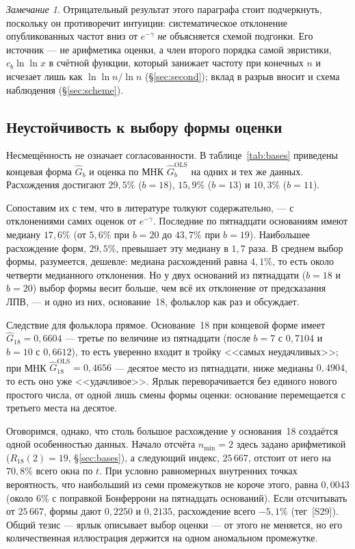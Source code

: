 \documentclass[11pt,a4paper]{article}
\theoremstyle{plain}
\theoremstyle{remark}
\newtheorem{remark}{Замечание}
\newcommand{\emg}{e^{-\gamma}}
\begin{document}
\begin{remark}
Отрицательный результат этого параграфа стоит подчеркнуть, поскольку он противоречит
интуиции: систематическое отклонение опубликованных частот вниз от $\emg$
\emph{не} объясняется схемой подгонки. Его источник --- не арифметика оценки, а
член второго порядка самой эвристики, $c_b\ln\ln x$ в счётной функции, который
занижает частоту при конечных $n$ и исчезает лишь как $\ln\ln n/\ln n$
(\S\ref{sec:second}); вклад в разрыв вносит и схема наблюдения
(\S\ref{sec:scheme}).
\end{remark}

\subsection{Неустойчивость к выбору формы оценки}\label{sec:instability}

Несмещённость не означает согласованности. В таблице~\ref{tab:bases} приведены
концевая форма $\hat G_b$ и оценка по МНК $\hat G_b^{\mathrm{OLS}}$ на одних и тех же
данных. Расхождения достигают $29{,}5\%$ ($b=18$), $15{,}9\%$ ($b=13$) и $10{,}3\%$
($b=11$).

Сопоставим их с тем, что в литературе толкуют содержательно, --- с отклонениями
самих оценок от $\emg$. Последние по пятнадцати основаниям имеют медиану $17{,}6\%$
(от $5{,}6\%$ при $b=20$ до $43{,}7\%$ при $b=19$). Наибольшее расхождение форм,
$29{,}5\%$, превышает эту медиану в $1{,}7$ раза. В среднем выбор формы, разумеется,
дешевле: медиана расхождений равна $4{,}1\%$, то есть около четверти медианного
отклонения. Но у двух оснований из пятнадцати ($b=18$ и $b=20$) выбор формы весит
больше, чем всё их отклонение от предсказания ЛПВ, --- и одно из них, основание~18,
фольклор как раз и обсуждает.

Следствие для фольклора прямое. Основание~18 при концевой форме имеет
$\hat G_{18}=0{,}6604$ --- третье по величине из пятнадцати (после $b=7$ с $0{,}7104$
и $b=10$ с $0{,}6612$), то есть уверенно входит в тройку <<самых неудачливых>>; при МНК
$\hat G_{18}^{\mathrm{OLS}}=0{,}4656$ --- десятое место из пятнадцати, ниже медианы
$0{,}4904$, то есть оно уже <<удачливое>>. Ярлык переворачивается без единого нового
простого числа, от одной лишь смены формы оценки: основание перемещается с третьего
места на десятое.

Оговоримся, однако, что столь большое расхождение у основания~18 создаётся одной
особенностью данных. Начало отсчёта $n_{\min}=2$ здесь задано арифметикой
($R_{18}(2)=19$, \S\ref{sec:bases}), а следующий индекс, $25\,667$, отстоит от него
на $70{,}8\%$ всего окна по $t$. При условно равномерных внутренних точках
вероятность, что наибольший из семи промежутков не короче этого, равна $0{,}0043$
(около $6\%$ с поправкой Бонферрони на пятнадцать оснований). Если отсчитывать от
$25\,667$, формы дают $0{,}2250$ и $0{,}2135$, расхождение всего $-5{,}1\%$
(тег~[S29]). Общий тезис --- ярлык описывает выбор оценки --- от этого не
меняется, но его количественная иллюстрация держится на одном аномальном
промежутке.
\end{document}
